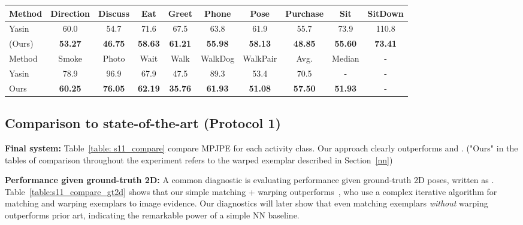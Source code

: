 \documentclass[10pt,twocolumn,letterpaper]{article}
\begin{document}
\begin{table*}[t!]
\centering
\begin{tabular}{|l|c|c|c|c|c|c|c|c|c|}
\hline
Method & Direction & Discuss & Eat & Greet & Phone & Pose & Purchase & Sit & SitDown\\
\hline
\hline
Yasin \cite{Yasin_2016_CVPR} & 60.0 & 54.7 & 71.6 & 67.5 & 63.8 & 61.9 & 55.7 & 73.9 & 110.8 \\
\hline
 (Ours) &\textbf{53.27} &\textbf{46.75} &\textbf{58.63} &\textbf{61.21} &\textbf{55.98} &\textbf{58.13} &\textbf{48.85} &\textbf{55.60} &\textbf{73.41}\\
\hline
\hline
Method & Smoke & Photo & Wait & Walk & WalkDog & WalkPair & Avg. & Median & -\\
\hline
\hline
Yasin \cite{Yasin_2016_CVPR} & 78.9 & 96.9 & 67.9 & 47.5 & 89.3 & 53.4 & 70.5 & -&- \\
\hline
Ours &\textbf{60.25} &\textbf{76.05} &\textbf{62.19} &\textbf{35.76} &\textbf{61.93} &\textbf{51.08} & \textbf{57.50} & \textbf{51.93}&-\\
\hline
\end{tabular}
\caption{Comparison to \cite{Yasin_2016_CVPR} by \textbf{Protocol 1} given 2D ground truth. Our approach is clearly state-of-the-art, indicating the effectiveness of our simple approach to NN matching and warping. Table~\ref{table: gt2d_nn_comp} shows that even simple NN matching produces an average accuracy of 70.93, rivaling prior art.}
\label{table:s11_compare_gt2d}
\end{table*}

\subsection{Comparison to state-of-the-art (Protocol 1)}

{\bf Final system:} Table~\ref{table: s11_compare} compare MPJPE for each activity class. Our approach clearly outperforms \cite{Yasin_2016_CVPR} and \cite{rogez2016mocap}. ("Ours" in the tables of comparison throughout the experiment refers to the warped exemplar  described in Section~\ref{nn}) 

{\bf Performance given ground-truth 2D:} A common diagnostic is evaluating performance given ground-truth 2D poses, written as . Table~\ref{table:s11_compare_gt2d} shows that our simple matching + warping outperforms~\cite{Yasin_2016_CVPR}, who use a complex iterative algorithm for matching and warping exemplars to image evidence. Our diagnostics will later show that even matching exemplars {\em without} warping outperforms prior art, indicating the remarkable power of a simple NN baseline.
\end{document}
